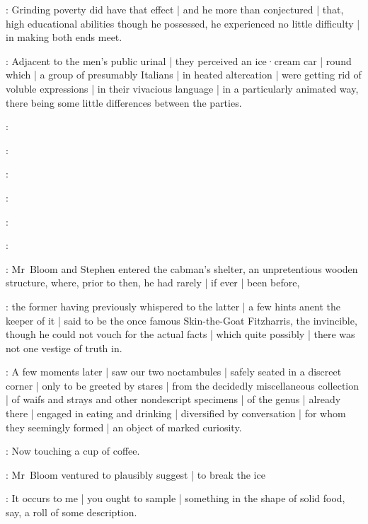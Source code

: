 :
Grinding poverty did have that effect |
and he more than conjectured |
that,
high educational abilities though he possessed,
he experienced no little difficulty |
in making both ends meet.

:
Adjacent to the men's public urinal |
they perceived an ice·cream car |
round which |
a group of presumably Italians |
in heated altercation |
were getting rid of voluble expressions |
in their vivacious language |
in a particularly animated way,
there being some little differences between the parties.

:

:

:

:

:

:

:
Mr~Bloom and Stephen entered the cabman's shelter,
an unpretentious wooden structure,
where,
prior to then,
he had rarely |
if ever |
been before,

:
the former having previously whispered to the latter |
a few hints anent the keeper of it |
said to be the once famous Skin-the-Goat Fitzharris,
the invincible,
though he could not vouch for the actual facts |
which quite possibly |
there was not one vestige of truth in.

:
A few moments later |
saw our two noctambules |
safely seated in a discreet corner |
only to be greeted by stares |
from the decidedly miscellaneous collection |
of waifs and strays and other nondescript specimens |
of the genus  |
already there |
engaged in eating and drinking |
diversified by conversation |
for whom they seemingly formed |
an object of marked curiosity.%

\Bloom:
Now touching a cup of coffee.

:
Mr~Bloom ventured to plausibly suggest |
to break the ice

\Bloom:
It occurs to me |
you ought to sample |
something in the shape of solid food,
say,
a roll of some description.

